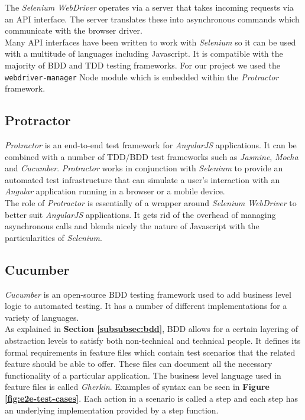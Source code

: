 The \textit{Selenium WebDriver} operates via a server that takes incoming requests via an API interface. The server translates these into asynchronous commands which communicate with the browser driver.
\\

Many API interfaces have been written to work with \textit{Selenium} so it can be used with a multitude of languages including Javascript. It is compatible with the majority of BDD and TDD testing frameworks. For our project we used the \texttt{webdriver-manager} Node module which is embedded within the \textit{Protractor} framework.

\subsection{Protractor}
\label{subsec:protractor}
\textit{Protractor} is an end-to-end test framework for \textit{AngularJS} applications. It can be combined with a number of TDD/BDD test frameworks such as \textit{Jasmine}, \textit{Mocha} and \textit{Cucumber}. \textit{Protractor} works in conjunction with \textit{Selenium} to provide an automated test infrastructure that can simulate a user’s interaction with an \textit{Angular} application running in a browser or a mobile device.
\\

The role of \textit{Protractor} is essentially of a wrapper around \textit{Selenium WebDriver} to better suit \textit{AngularJS} applications. It gets rid of the overhead of managing asynchronous calls and blends nicely the nature of Javascript with the particularities of \textit{Selenium}.

\subsection{Cucumber}
\label{subsec:cucumber}
\textit{Cucumber} is an open-source BDD testing framework used to add business level logic to automated testing. It has a number of different implementations for a variety of languages.
\\

As explained in \textbf{Section \ref{subsubsec:bdd}}, BDD allows for a certain layering of abstraction levels to satisfy both non-technical and technical people. It defines its formal requirements in feature files which contain test scenarios that the related feature should be able to offer. These files can document all the necessary functionality of a particular application. The business level language used in feature files is called \textit{Gherkin}. Examples of syntax can be seen in \textbf{Figure \ref{fig:e2e-test-cases}}. Each action in a scenario is called a step and each step has an underlying implementation provided by a step function.
\\

